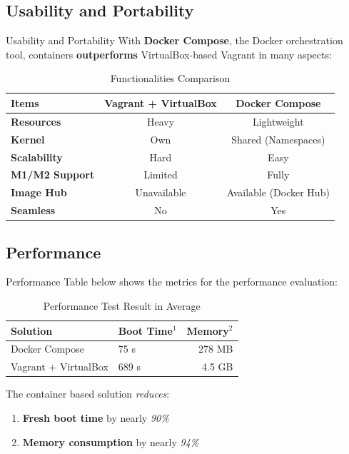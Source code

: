 \documentclass{beamer}
\begin{document}
\subsection{Usability and Portability}
\begin{frame}{Usability and Portability}
With \textbf{Docker Compose}, the Docker orchestration tool, containers \textbf{outperforms} VirtualBox-based Vagrant in many aspects:
\begin{table}[t!]
  \begin{center}
    \caption{Functionalities Comparison}
    \begin{tabular}{|l|c|c|}
    \hline
    \textbf{Items} & \textbf{Vagrant + VirtualBox} & \textbf{Docker Compose} \\
    \hline
    \textbf{Resources} & Heavy & Lightweight \\
    \hline
    \textbf{Kernel} & Own & Shared (Namespaces)\\
    \hline
    \textbf{Scalability} & Hard & Easy \\
    \hline
    \textbf{M1/M2 Support} & Limited & Fully \\
    \hline
    \textbf{Image Hub} & Unavailable & Available (Docker Hub) \\
    \hline
    \textbf{Seamless} & No & Yes \\
    \hline
    \end{tabular}
    \label{tab:compare}
  \end{center}
\end{table}
\end{frame}

\subsection{Performance}
\begin{frame}{Performance}
    Table below shows the metrics for the performance evaluation:
    \begin{table}[t!]
      \begin{center}
        \caption{Performance Test Result in Average}
        \begin{tabular}{|l|lr|}
        \hline
        Solution               & Boot Time$^1$ & Memory$^2$ \\
        \hline
        Docker Compose         &   75 s    &  278 MB \\
        Vagrant + VirtualBox   &  689 s    &  4.5 GB \\
        \hline
        \end{tabular}
        \label{tab:result}
      \end{center}
    \end{table}
    The container based solution \textit{reduces}:
    \begin{enumerate}
    \item \textbf{Fresh boot time} by nearly \textit{90\%}
    \item \textbf{Memory consumption} by nearly \textit{94\%}
    \end{enumerate}
\end{frame}
\end{document}
